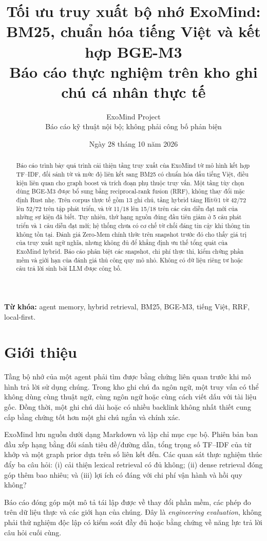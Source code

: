 \documentclass[11pt,a4paper]{article}
\title{Tối ưu truy xuất bộ nhớ ExoMind:\\BM25, chuẩn hóa tiếng Việt và kết hợp BGE-M3\\\large Báo cáo thực nghiệm trên kho ghi chú cá nhân thực tế}
\author{ExoMind Project\\\small Báo cáo kỹ thuật nội bộ; không phải công bố phản biện}
\date{Ngày 28 tháng 10 năm 2026}
\begin{document}
\maketitle
\begin{abstract}
Báo cáo trình bày quá trình cải thiện tầng truy xuất của ExoMind từ mô hình kết hợp TF--IDF, đối sánh từ và mức độ liên kết sang BM25 có chuẩn hóa dấu tiếng Việt, điều kiện liên quan cho graph boost và trích đoạn phụ thuộc truy vấn. Một tầng tùy chọn dùng BGE-M3 được bổ sung bằng reciprocal-rank fusion (RRF), không thay đổi mặc định Rust nhẹ. Trên corpus thực tế gồm 13 ghi chú, tầng hybrid tăng Hit@1 từ 42/72 lên 52/72 trên tập phát triển, và từ 11/18 lên 15/18 trên các câu diễn đạt mới của những sự kiện đã biết. Tuy nhiên, thứ hạng nguồn đúng đầu tiên giảm ở 5 câu phát triển và 1 câu diễn đạt mới; hệ thống chưa có cơ chế từ chối đáng tin cậy khi thông tin không tồn tại. Đánh giá Zero-Mem chính thức trên snapshot trước đó cho thấy giá trị của truy xuất ngữ nghĩa, nhưng không đủ để khẳng định ưu thế tổng quát của ExoMind hybrid. Báo cáo phân biệt các snapshot, chi phí thực thi, kiểm chứng phần mềm và giới hạn của đánh giá thủ công quy mô nhỏ. Không có dữ liệu riêng tư hoặc câu trả lời sinh bởi LLM được công bố.
\end{abstract}
\noindent\textbf{Từ khóa:} agent memory, hybrid retrieval, BM25, BGE-M3, tiếng Việt, RRF, local-first.

\section{Giới thiệu}
Tầng bộ nhớ của một agent phải tìm được bằng chứng liên quan trước khi mô hình trả lời sử dụng chúng. Trong kho ghi chú đa ngôn ngữ, một truy vấn có thể không dùng cùng thuật ngữ, cùng ngôn ngữ hoặc cùng cách viết dấu với tài liệu gốc. Đồng thời, một ghi chú dài hoặc có nhiều backlink không nhất thiết cung cấp bằng chứng tốt hơn một ghi chú ngắn và chính xác.

ExoMind lưu nguồn dưới dạng Markdown và lập chỉ mục cục bộ. Phiên bản ban đầu xếp hạng bằng đối sánh tiêu đề/đường dẫn, tổng trọng số TF--IDF của từ khớp và một graph prior dựa trên số liên kết đến. Các quan sát thực nghiệm thúc đẩy ba câu hỏi: (i) cải thiện lexical retrieval có đủ không; (ii) dense retrieval đóng góp thêm bao nhiêu; và (iii) lợi ích có đáng với chi phí vận hành và hồi quy không?

Báo cáo đóng góp một mô tả tái lập được về thay đổi phần mềm, các phép đo trên dữ liệu thực và các giới hạn của chúng. Đây là \emph{engineering evaluation}, không phải thử nghiệm độc lập có kiểm soát đầy đủ hoặc bằng chứng về năng lực trả lời câu hỏi cuối cùng.
\end{document}
